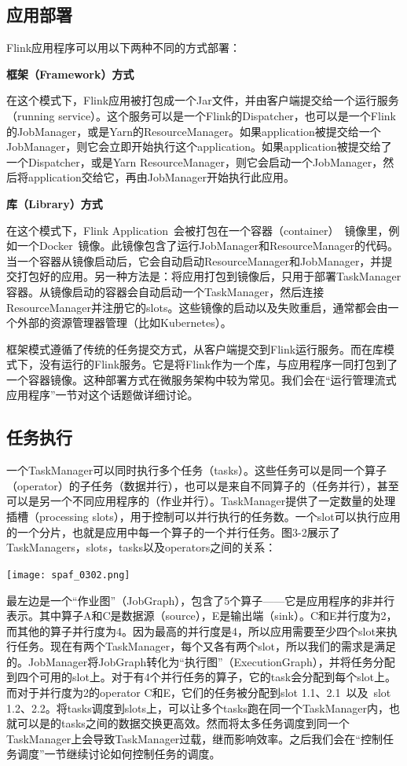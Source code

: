 \documentclass[oneside]{ctexbook}
\begin{document}
\subsection{应用部署}

Flink应用程序可以用以下两种不同的方式部署：

\textbf{框架（Framework）方式}

在这个模式下，Flink应用被打包成一个Jar文件，并由客户端提交给一个运行服务（running service）。这个服务可以是一个Flink的Dispatcher，也可以是一个Flink的JobManager，或是Yarn的ResourceManager。如果application被提交给一个JobManager，则它会立即开始执行这个application。如果application被提交给了一个Dispatcher，或是Yarn ResourceManager，则它会启动一个JobManager，然后将application交给它，再由JobManager开始执行此应用。

\textbf{库（Library）方式}

在这个模式下，Flink Application 会被打包在一个容器（container） 镜像里，例如一个Docker 镜像。此镜像包含了运行JobManager和ResourceManager的代码。当一个容器从镜像启动后，它会自动启动ResourceManager和JobManager，并提交打包好的应用。另一种方法是：将应用打包到镜像后，只用于部署TaskManager容器。从镜像启动的容器会自动启动一个TaskManager，然后连接ResourceManager并注册它的slots。这些镜像的启动以及失败重启，通常都会由一个外部的资源管理器管理（比如Kubernetes）。

框架模式遵循了传统的任务提交方式，从客户端提交到Flink运行服务。而在库模式下，没有运行的Flink服务。它是将Flink作为一个库，与应用程序一同打包到了一个容器镜像。这种部署方式在微服务架构中较为常见。我们会在“运行管理流式应用程序”一节对这个话题做详细讨论。

\subsection{任务执行}

一个TaskManager可以同时执行多个任务（tasks）。这些任务可以是同一个算子（operator）的子任务（数据并行），也可以是来自不同算子的（任务并行），甚至可以是另一个不同应用程序的（作业并行）。TaskManager提供了一定数量的处理插槽（processing slots），用于控制可以并行执行的任务数。一个slot可以执行应用的一个分片，也就是应用中每一个算子的一个并行任务。图3-2展示了TaskManagers，slots，tasks以及operators之间的关系：

\noindent \texttt{[image: spaf\_0302.png]}

最左边是一个“作业图”（JobGraph），包含了5个算子——它是应用程序的非并行表示。其中算子A和C是数据源（source），E是输出端（sink）。C和E并行度为2，而其他的算子并行度为4。因为最高的并行度是4，所以应用需要至少四个slot来执行任务。现在有两个TaskManager，每个又各有两个slot，所以我们的需求是满足的。JobManager将JobGraph转化为“执行图”（ExecutionGraph），并将任务分配到四个可用的slot上。对于有4个并行任务的算子，它的task会分配到每个slot上。而对于并行度为2的operator C和E，它们的任务被分配到slot 1.1、2.1 以及 slot 1.2、2.2。将tasks调度到slots上，可以让多个tasks跑在同一个TaskManager内，也就可以是的tasks之间的数据交换更高效。然而将太多任务调度到同一个TaskManager上会导致TaskManager过载，继而影响效率。之后我们会在“控制任务调度”一节继续讨论如何控制任务的调度。
\end{document}
